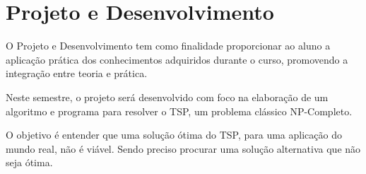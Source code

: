 \chapter{Projeto e Desenvolvimento}

O Projeto e Desenvolvimento tem como finalidade proporcionar ao aluno a aplicação prática dos conhecimentos adquiridos durante o curso, promovendo a integração entre teoria e prática.

Neste semestre, o projeto será desenvolvido com foco na elaboração de um algoritmo e programa para resolver o TSP, um problema clássico NP-Completo.

O objetivo é entender que uma solução ótima do TSP, para uma aplicação do mundo real, não é viável. Sendo preciso procurar uma solução alternativa
que não seja ótima.
